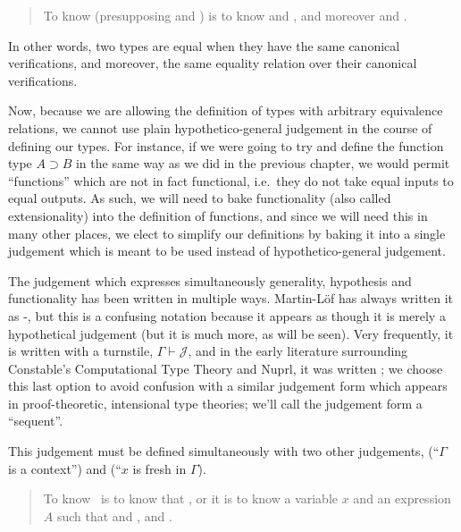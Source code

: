 \documentclass[main.tex]{subfiles}
\begin{document}
\begin{quote}
  To know  (presupposing  and ) is to know
 and
, and moreover
 and
.
\end{quote}

In other words, two types are equal when they have the same canonical
verifications, and moreover, the same equality relation over their canonical
verifications.

Now, because we are allowing the definition of types with arbitrary equivalence
relations, we cannot use plain hypothetico-general judgement in the course of
defining our types. For instance, if we were going to try and define the
function type $A\supset B$ in the same way as we did in the previous chapter,
we would permit ``functions'' which are not in fact functional, i.e.\ they do
not take equal inputs to equal outputs. As such, we will need to bake
functionality (also called extensionality) into the definition of functions,
and since we will need this in many other places, we elect to simplify our
definitions by baking it into a single judgement which is meant to be used
instead of hypothetico-general judgement.

The judgement which expresses simultaneously generality, hypothesis and
functionality has been written in multiple ways. Martin-L\"of has always
written it as \hyp{}{\Gamma}, but this is a confusing notation
because it appears as though it is merely a hypothetical judgement (but it is
much more, as will be seen). Very frequently, it is written with a turnstile,
$\Gamma\vdash\mathcal{J}$, and in the early literature surrounding Constable's
Computational Type Theory and Nuprl, it was written
; we choose this last option to avoid
confusion with a similar judgement form which appears in proof-theoretic,
intensional type theories; we'll call the judgement form a ``sequent''.

This judgement must be defined simultaneously with two other judgements,
\framebox{\isctx{\Gamma}} (``$\Gamma$ is a context'') and
 (``$x$ is fresh in $\Gamma$).

\begin{quote}
  To know \isctx\Gamma\ is to know that \reduce{\Gamma}{\cdot}, or it is to know
  a variable $x$ and an expression $A$ such that 
  and , and .
\end{quote}
\end{document}
